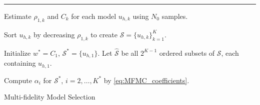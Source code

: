 \documentclass[final,3p,times,11pt]{elsarticle}
\begin{document}
\normalem
\begin{algorithm}[!ht]
\label{algo:MFMC_Algo_model_selection}
\DontPrintSemicolon    
   \vspace{1ex}
    
    \vspace{1ex}
    \hrule \vspace{1ex}

   Estimate $\rho_{1,k}$ and $C_k$ for each model $u_{h, k}$ using $N_0$ samples.
   
   
   Sort $u_{h, k}$ by decreasing $\rho_{1,k}$ to create $\mathcal{S}=\{u_{h, k}\}_{k=1}^K$. 
   
   Initialize $w^*=C_1$, $\mathcal{S}^*=\{u_{h, 1}\}$. Let $ \mathcal{\widehat S}$ be all $2^{K-1}$ ordered subsets of $\mathcal{S}$, each containing $u_{h, 1}$. 

    Compute $\alpha_i$ for $\mathcal{S}^*$, $i=2,\dots, K^*$ by \eqref{eq:MFMC_coefficients}.
\caption{Multi-fidelity Model Selection}
\end{algorithm}
\ULforem
\end{document}
